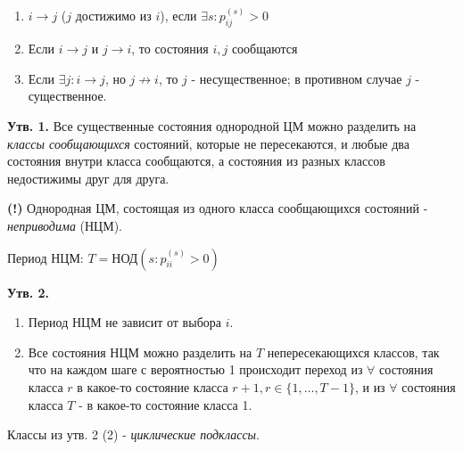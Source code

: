 \begin{enumerate}
	\item $i \to j$ ($j$ достижимо из $i$), если $\exists s: p_{ij}^{(s)}>0$
	\item Если $i \to j$ и $j \to i$, то состояния $i,j$ сообщаются
	\item Если $\exists j: i \to j$, но $j \not\to i$, то $j$ - несущественное; в противном случае $j$ - существенное.
\end{enumerate}

\textbf{Утв. 1.} Все существенные состояния однородной ЦМ можно разделить на \textit{классы сообщающихся} состояний, которые не пересекаются, и любые два состояния внутри класса сообщаются, а состояния из разных классов недостижимы друг для друга.

\noindent\textbf{(!)} Однородная ЦМ, состоящая из одного класса сообщающихся состояний - \textit{неприводима} (НЦМ).

Период НЦМ: $T = \text{НОД}(s: p_{ii}^{(s)} > 0)$

\textbf{Утв. 2.}
\begin{enumerate}
	\item Период НЦМ не зависит от выбора $i$.
	\item Все состояния НЦМ можно разделить на $T$ непересекающихся классов, так что на каждом шаге с вероятностью 1 происходит переход из $\forall$ состояния класса $r$ в какое-то состояние класса $r+1, r \in \{1, \dots, T-1\}$, и из $\forall$ состояния класса $T$ - в какое-то состояние класса 1.
\end{enumerate}
\begin{remark}
	Классы из утв. 2 (2) - \textit{циклические подклассы}.
\end{remark}

